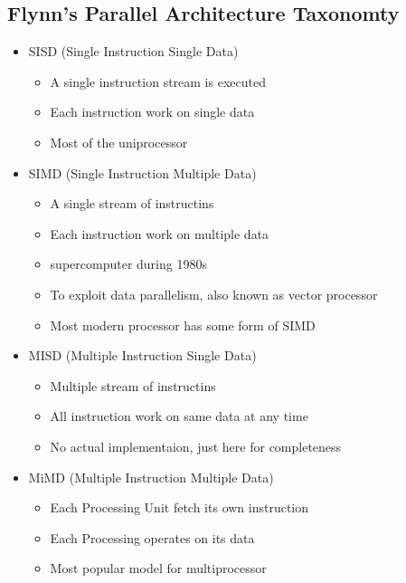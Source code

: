 \documentclass{article}
\begin{document}
\subsection{Flynn's Parallel Architecture Taxonomty}
\begin{itemize}
    \item SISD (Single Instruction Single Data)
          \begin{itemize}
              \item A single instruction stream is executed
              \item Each instruction work on single data
              \item Most of the uniprocessor
          \end{itemize}
    \item SIMD (Single Instruction Multiple Data)
          \begin{itemize}
              \item A single stream of instructins
              \item Each instruction work on multiple data
              \item supercomputer during 1980s
              \item To exploit data parallelism, also known as vector processor
              \item Most modern processor has some form of SIMD
          \end{itemize}
    \item MISD (Multiple Instruction Single Data)
          \begin{itemize}
              \item Multiple stream of instructins
              \item All instruction work on same data at any time
              \item No actual implementaion, just here for completeness
          \end{itemize}
    \item MiMD (Multiple Instruction Multiple Data)
          \begin{itemize}
              \item Each Processing Unit fetch its own instruction
              \item Each Processing operates on its data
              \item Most popular model for multiprocessor
          \end{itemize}
\end{itemize}
\end{document}
